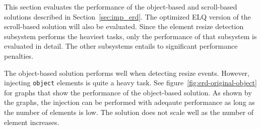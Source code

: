 \documentclass[a4paper,11pt]{kth-mag}
\newcommand{\code}[1]{\texttt{#1}}
\begin{document}
      
        This section evaluates the performance of the object-based and scroll-based solutions described in Section~\ref{sec:imp_erd}.
        The optimized \gls{ELQ} version of the scroll-based solution will also be evaluated.
        Since the element resize detection subsystem performs the heaviest tasks, only the performance of that subsystem is evaluated in detail.
        The other subsystems entails to significant performance penalties.

        The object-based solution performs well when detecting resize events.
        However, injecting \code{object} \glspl{element} is quite a heavy task.
        See figure~\ref{fig:erd-original-object} for graphs that show the performance of the object-based solution.
        As shown by the graphs, the injection can be performed with adeqaute performance as long as the number of \glspl{element} is low.
        The solution does not scale well as the number of element increases.
\end{document}
